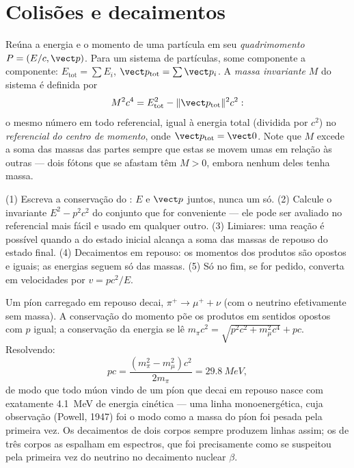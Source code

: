 \section{Colisões e decaimentos}

\begin{definition}\label{def:b3:relativistic-dynamics:four-momentum}
Reúna a energia e o momento de uma partícula em seu
\emph{quadrimomento} $P = (E/c, \vect p)$. Para um sistema de
partículas, some componente a componente:
$E_{\text{tot}} = \sum E_i$, $\vect p_{\text{tot}} = \sum\vect p_i$.
A \emph{massa invariante} $M$ do sistema é definida por
\[
M^2c^4 = E_{\text{tot}}^2 - \|\vect p_{\text{tot}}\|^2c^2 :
\]
o mesmo número em todo referencial, igual à energia total (dividida
por $c^2$) no \emph{referencial do centro de momento}, onde
$\vect p_{\text{tot}} = \vect 0$. Note que $M$ excede a soma das
massas das partes sempre que estas se movem umas em relação às outras
--- dois fótons que se afastam têm $M > 0$, embora nenhum deles tenha
massa.
\end{definition}

\begin{method}\label{met:b3:relativistic-dynamics:method}
(1) Escreva a conservação do : $E$ e $\vect p$ juntos,
nunca um só. (2) Calcule o invariante $E^2 - p^2c^2$ do conjunto que
for conveniente --- ele pode ser avaliado no referencial mais fácil e
usado em qualquer outro. (3) Limiares: uma reação é possível quando a
 do estado inicial alcança a soma das massas de
repouso do estado final. (4) Decaimentos em repouso: os momentos dos
produtos são opostos e iguais; as energias seguem só das massas. (5)
Só no fim, se for pedido, converta em velocidades por $v = pc^2/E$.
\end{method}

\begin{example}\label{ex:b3:relativistic-dynamics:pion}
Um píon carregado em repouso decai, $\pi^+ \to \mu^+ + \nu$ (com o
neutrino efetivamente sem massa). A conservação do momento põe os
produtos em sentidos opostos com $p$ igual; a conservação da energia se
lê $m_\pi c^2 =
\sqrt{p^2c^2 + m_\mu^2c^4} + pc$. Resolvendo:
\[
pc = \frac{(m_\pi^2 - m_\mu^2)c^2}{2m_\pi} = \qty{29.8}{MeV} ,
\]
de modo que todo múon vindo de um píon que decai em repouso nasce com
exatamente \qty{4.1}{MeV} de energia cinética --- uma linha
monoenergética, cuja observação (Powell, 1947) foi o modo como a massa
do píon foi pesada pela primeira vez. Os decaimentos de dois corpos
sempre produzem linhas assim; os de três corpos as espalham em
espectros, que foi precisamente como se suspeitou pela primeira vez do
neutrino no decaimento nuclear $\beta$.
\end{example}

